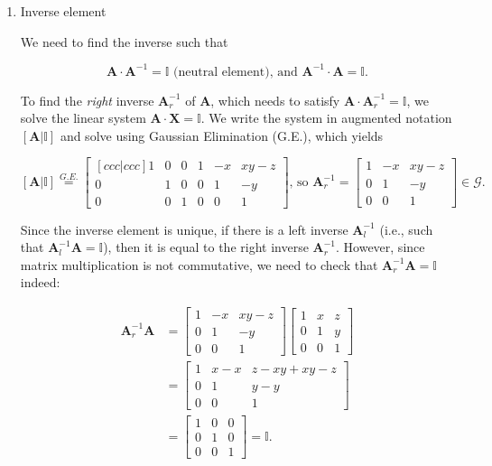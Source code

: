 \documentclass{article}
\def\ma{{\bm{A}}}
\def\mx{{\bm{X}}}
\def\I{{\mathbb{I}}}
\begin{document}
\begin{enumerate}
    \item Inverse element
    
    We need to find the inverse such that
    
    \[
    \ma \cdot \ma^{-1} = \I\text{ (neutral element), and } \ma^{-1} \cdot \ma = \I.
    \]
    
    To find the \textit{right} inverse $\ma_r^{-1}$ of $\ma$, which needs to satisfy $\ma \cdot \ma_r^{-1} = \I$, we solve the linear system $\ma \cdot \mx = \I$. We write the system in augmented notation $[\ma | \I]$ and solve using Gaussian Elimination (G.E.), which yields
    
    \[
    [\ma | \I] \overset{G.E.}{=} \begin{bmatrix}[c c c | c c c]
        1 & 0 & 0 & 1 & -x & xy - z\\
        0 & 1 & 0 & 0 & 1 & -y\\
        0 & 0 & 1 & 0 & 0 & 1
    \end{bmatrix}\text{, so } \ma_r^{-1} = \begin{bmatrix}
        1 & -x & xy - z\\
        0 & 1 & -y\\
        0 & 0 & 1
    \end{bmatrix} \in \mathcal{G}.
    \]
    
    Since the inverse element is unique, if there is a left inverse $\ma_l^{-1}$ (i.e., such that $\ma_l^{-1}\ma = \I$), then it is equal to the right inverse $\ma_r^{-1}$. However, since matrix multiplication is not commutative, we need to check that $\ma_r^{-1}\ma = \I$ indeed:
    
    \begin{equation}
    \begin{split}
    \ma_r^{-1}\ma & = \begin{bmatrix}
        1 & -x & xy - z\\
        0 & 1 & -y\\
        0 & 0 & 1
    \end{bmatrix} \begin{bmatrix}
        1 & x & z\\
        0 & 1 & y\\
        0 & 0 & 1
    \end{bmatrix}\\ & = \begin{bmatrix}
        1 & x - x & z - xy + xy - z\\
        0 & 1 & y - y\\
        0 & 0 & 1
    \end{bmatrix}\\ & = \begin{bmatrix}
        1 & 0 & 0\\
        0 & 1 & 0\\
        0 & 0 & 1
    \end{bmatrix} = \I.
    \end{split}
    \end{equation}
    

\end{enumerate}
\end{document}
